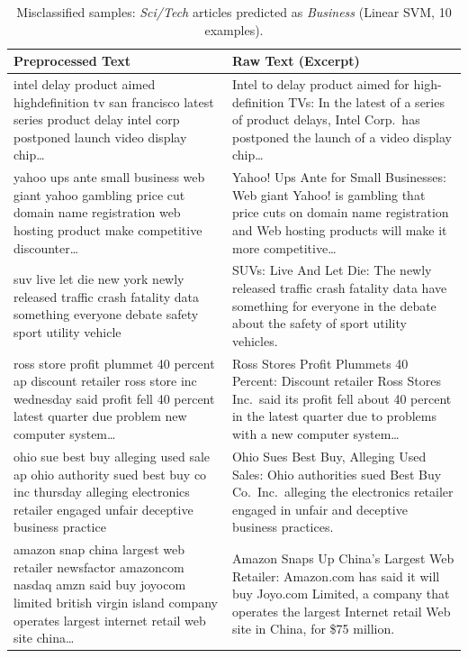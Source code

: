 \begin{table}[htbp]
\centering
\caption{Misclassified samples: \textit{Sci/Tech} articles predicted as \textit{Business} (Linear SVM, 10 examples).}
\label{tab:error-analysis-sci-to-biz}
\small
\begin{tabular}{p{0.6\textheight} p{0.6\textheight}}
\toprule
\textbf{Preprocessed Text} & \textbf{Raw Text (Excerpt)} \\
\midrule
intel delay product aimed highdefinition tv san francisco latest series product delay intel corp postponed launch video display chip\ldots &
Intel to delay product aimed for high-definition TVs: In the latest of a series of product delays, Intel Corp.\ has postponed the launch of a video display chip\ldots \\
\addlinespace
yahoo ups ante small business web giant yahoo gambling price cut domain name registration web hosting product make competitive discounter\ldots &
Yahoo! Ups Ante for Small Businesses: Web giant Yahoo! is gambling that price cuts on domain name registration and Web hosting products will make it more competitive\ldots \\
\addlinespace
suv live let die new york newly released traffic crash fatality data something everyone debate safety sport utility vehicle &
SUVs: Live And Let Die: The newly released traffic crash fatality data have something for everyone in the debate about the safety of sport utility vehicles. \\
\addlinespace
ross store profit plummet 40 percent ap discount retailer ross store inc wednesday said profit fell 40 percent latest quarter due problem new computer system\ldots &
Ross Stores Profit Plummets 40 Percent: Discount retailer Ross Stores Inc.\ said its profit fell about 40 percent in the latest quarter due to problems with a new computer system\ldots \\
\addlinespace
ohio sue best buy alleging used sale ap ohio authority sued best buy co inc thursday alleging electronics retailer engaged unfair deceptive business practice &
Ohio Sues Best Buy, Alleging Used Sales: Ohio authorities sued Best Buy Co.\ Inc.\ alleging the electronics retailer engaged in unfair and deceptive business practices. \\
\addlinespace
amazon snap china largest web retailer newsfactor amazoncom nasdaq amzn said buy joyocom limited british virgin island company operates largest internet retail web site china\ldots &
Amazon Snaps Up China's Largest Web Retailer: Amazon.com has said it will buy Joyo.com Limited, a company that operates the largest Internet retail Web site in China, for \$75 million. \\

\end{tabular}
\end{table}
